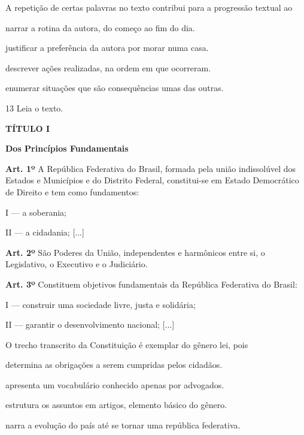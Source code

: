 A repetição de certas palavras no texto contribui para a progressão textual ao

\begin{escolha}
\item narrar a rotina da autora, do começo ao fim do dia.

\item justificar a preferência da autora por morar numa casa.

\item descrever ações realizadas, na ordem em que ocorreram.

\item enumerar situações que são consequências umas das outras.
\end{escolha}

\pagebreak

\num{13} Leia o texto.

\begin{myquote}
\textbf{TÍTULO I}

\textbf{Dos Princípios Fundamentais}

\textbf{Art. 1º} A República Federativa do Brasil, formada pela união
indissolúvel dos Estados e Municípios e do Distrito Federal,
constitui-se em Estado Democrático de Direito e tem como fundamentos:

I --- a soberania;

II --- a cidadania; {[}...{]}

\textbf{Art. 2º} São Poderes da União, independentes e harmônicos entre si, o
Legislativo, o Executivo e o Judiciário.

\textbf{Art. 3º} Constituem objetivos fundamentais da República Federativa do
Brasil:

I --- construir uma sociedade livre, justa e solidária;

II --- garantir o desenvolvimento nacional; {[}...{]}

\end{myquote}

O trecho transcrito da Constituição é exemplar do gênero lei, pois

\begin{escolha}
\item determina as obrigações a serem cumpridas pelos cidadãos.

\item apresenta um vocabulário conhecido apenas por advogados.

\item estrutura os assuntos em artigos, elemento básico do gênero.

\item narra a evolução do país até se tornar uma república federativa.
\end{escolha}

